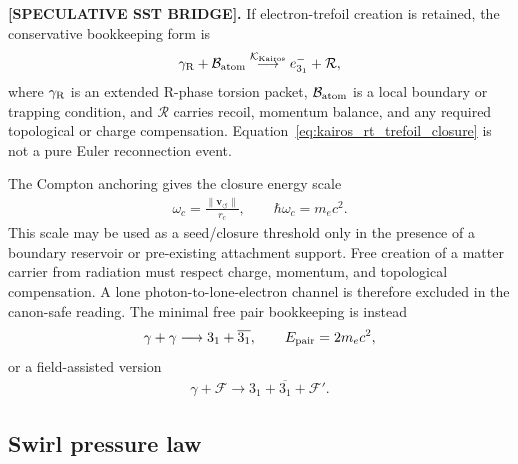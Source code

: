 \documentclass[11pt]{article}
\theoremstyle{definition}
\theoremstyle{plain}
\theoremstyle{remark}
\newcommand{\rc}{{r_c}}
\newcommand{\vnorm}{\lVert \mathbf{v}_{\!\boldsymbol{\circlearrowleft}} \rVert}
\begin{document}
        \textbf{[SPECULATIVE SST BRIDGE].}
        If electron-trefoil creation is retained, the conservative bookkeeping
        form is
        \begin{align}
            \gamma_{\rm R}
            +
            \mathcal{B}_{\rm atom}
            \overset{\mathcal{K}_{\rm Kairos}}{\longrightarrow}
            e^-_{3_1}
            +
            \mathcal{R},
            \label{eq:kairos_rt_trefoil_closure}
        \end{align}
        where \(\gamma_{\rm R}\) is an extended R-phase torsion packet,
        \(\mathcal{B}_{\rm atom}\) is a local boundary or trapping condition, and
        \(\mathcal{R}\) carries recoil, momentum balance, and any required
        topological or charge compensation. Equation~\eqref{eq:kairos_rt_trefoil_closure}
        is not a pure Euler reconnection event.

        The Compton anchoring gives the closure energy scale
        \begin{align}
            \omega_c = \frac{\vnorm}{\rc},
            \qquad
            \hbar\omega_c = m_e c^2.
            \label{eq:compton_closure_energy_scale}
        \end{align}
        This scale may be used as a seed/closure threshold only in the presence
        of a boundary reservoir or pre-existing attachment support. Free creation
        of a matter carrier from radiation must respect charge, momentum, and
        topological compensation. A lone photon-to-lone-electron channel is
        therefore excluded in the canon-safe reading. The minimal free pair
        bookkeeping is instead
        \begin{align}
            \gamma+\gamma
            \longrightarrow
            3_1+\overline{3_1},
            \qquad
            E_{\rm pair}=2m_e c^2,
            \label{eq:trefoil_antitrefoil_pair_bookkeeping}
        \end{align}
        or a field-assisted version
        \begin{align}
            \gamma+\mathcal{F}
            \longrightarrow
            3_1+\overline{3_1}+\mathcal{F}' .
            \label{eq:field_assisted_pair_bookkeeping}
        \end{align}

    \subsection{Swirl pressure law}
        \label{subsec:swirl_pressure_law}
\end{document}
